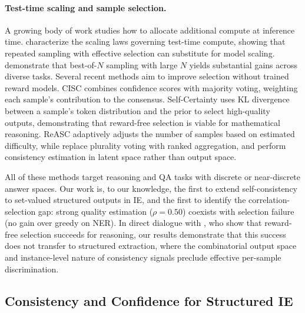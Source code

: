 \paragraph{Test-time scaling and sample selection.}
A growing body of work studies how to allocate additional compute at inference time.
\citet{snell2024scaling} characterize the scaling laws governing test-time compute, showing that repeated sampling with effective selection can substitute for model scaling.
\citet{brown2024monkeys} demonstrate that best-of-$N$ sampling with large $N$ yields substantial gains across diverse tasks.
Several recent methods aim to improve selection without trained reward models.
CISC \cite{taubenfeld2025cisc} combines confidence scores with majority voting, weighting each sample's contribution to the consensus.
Self-Certainty \cite{kang2025selfcertainty} uses KL divergence between a sample's token distribution and the prior to select high-quality outputs, demonstrating that reward-free selection is viable for mathematical reasoning.
ReASC \cite{kim2026reasc} adaptively adjusts the number of samples based on estimated difficulty, while \citet{wang2025rankedvoting} replace plurality voting with ranked aggregation, and \citet{oh2025latentsc} perform consistency estimation in latent space rather than output space.

All of these methods target reasoning and QA tasks with discrete or near-discrete answer spaces.
Our work is, to our knowledge, the first to extend self-consistency to set-valued structured outputs in IE, and the first to identify the correlation-selection gap: strong quality estimation ($\rho{=}0.50$) coexists with selection failure (no gain over greedy on NER).
In direct dialogue with \citet{kang2025selfcertainty}, who show that reward-free selection succeeds for reasoning, our results demonstrate that this success does not transfer to structured extraction, where the combinatorial output space and instance-level nature of consistency signals preclude effective per-sample discrimination.

\subsection{Consistency and Confidence for Structured IE}

